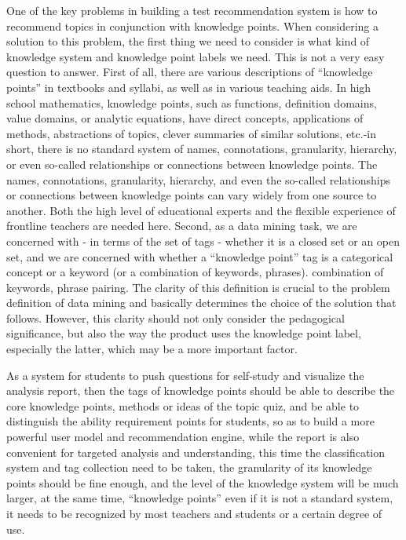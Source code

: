 One of the key problems in building a test recommendation system is how to recommend topics in conjunction with knowledge points. When considering a solution to this problem, the first thing we need to consider is what kind of knowledge system and knowledge point labels we need. This is not a very easy question to answer. First of all, there are various descriptions of ``knowledge points'' in textbooks and syllabi, as well as in various teaching aids. In high school mathematics, knowledge points, such as functions, definition domains, value domains, or analytic equations, have direct concepts, applications of methods, abstractions of topics, clever summaries of similar solutions, etc.-in short, there is no standard system of names, connotations, granularity, hierarchy, or even so-called relationships or connections between knowledge points. The names, connotations, granularity, hierarchy, and even the so-called relationships or connections between knowledge points can vary widely from one source to another. Both the high level of educational experts and the flexible experience of frontline teachers are needed here. Second, as a data mining task, we are concerned with - in terms of the set of tags - whether it is a closed set or an open set, and we are concerned with whether a ``knowledge point'' tag is a categorical concept or a keyword (or a combination of keywords, phrases). combination of keywords, phrase pairing. The clarity of this definition is crucial to the problem definition of data mining and basically determines the choice of the solution that follows. However, this clarity should not only consider the pedagogical significance, but also the way the product uses the knowledge point label, especially the latter, which may be a more important factor.

As a system for students to push questions for self-study and visualize the analysis report, then the tags of knowledge points should be able to describe the core knowledge points, methods or ideas of the topic quiz, and be able to distinguish the ability requirement points for students, so as to build a more powerful user model and recommendation engine, while the report is also convenient for targeted analysis and understanding, this time the classification system and tag collection need to be taken, the granularity of its knowledge points should be fine enough, and the level of the knowledge system will be much larger, at the same time, ``knowledge points'' even if it is not a standard system, it needs to be recognized by most teachers and students or a certain degree of use.

